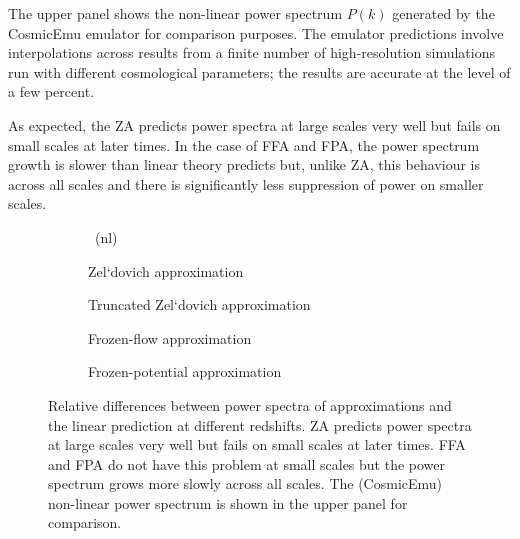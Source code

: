 The upper panel shows the non-linear power spectrum $P(k)$ generated by the CosmicEmu emulator \parencite{Heitmann:2015xma} for comparison purposes. The emulator predictions involve interpolations across results from a finite number of high-resolution simulations run with different cosmological parameters; the results are accurate at the level of a few percent.

As expected, the ZA predicts power spectra at large scales very well but fails on small scales at later times. In the case of FFA and FPA, the power spectrum growth is slower than linear theory predicts but, unlike ZA, this behaviour is across all scales and there is significantly less suppression of power on smaller scales.
\begin{figure*}
\centering
	\begin{subfigure}{1.0\textwidth}
	\end{subfigure}
	\begin{subfigure}{0.5\textwidth}
		\caption{\LCDM\ (nl)}	
	\end{subfigure}
	\begin{subfigure}{0.5\textwidth}
		\caption{Zel`dovich approximation}
	\end{subfigure}%
	\begin{subfigure}{0.5\textwidth}
		\caption{Truncated Zel`dovich approximation}
	\end{subfigure}
	\begin{subfigure}{0.5\textwidth}
		\caption{Frozen-flow approximation}
	\end{subfigure}%
	\begin{subfigure}{0.5\textwidth}
		\caption{Frozen-potential approximation}
	\end{subfigure}
	\caption{Relative differences between power spectra of approximations and the linear prediction at different redshifts. ZA predicts power spectra at large scales very well but fails on small scales at later times. FFA and FPA do not have this problem at small scales but the power spectrum grows more slowly across all scales. The (CosmicEmu) non-linear power spectrum is shown in the upper panel for comparison.}
	\label{fig:pwr_spec_diff}
\end{figure*}